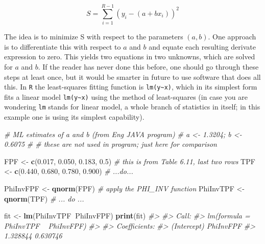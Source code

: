 \documentclass[
]{book}
\newenvironment{Shaded}{\begin{snugshade}}{\end{snugshade}}
\newcommand{\CommentTok}[1]{\textcolor[rgb]{0.56,0.35,0.01}{\textit{#1}}}
\newcommand{\FloatTok}[1]{\textcolor[rgb]{0.00,0.00,0.81}{#1}}
\newcommand{\KeywordTok}[1]{\textcolor[rgb]{0.13,0.29,0.53}{\textbf{#1}}}
\newcommand{\NormalTok}[1]{#1}
\newcommand{\OperatorTok}[1]{\textcolor[rgb]{0.81,0.36,0.00}{\textbf{#1}}}
\newcommand{\StringTok}[1]{\textcolor[rgb]{0.31,0.60,0.02}{#1}}
\begin{document}
\begin{equation*} 
S  = \sum_{i=1}^{R-1}\left ( y_i - \left ( a + bx_i \right ) \right )^2
\end{equation*}

The idea is to minimize S with respect to the parameters \((a,b)\). One approach is to differentiate this with respect to \(a\) and \(b\) and equate each resulting derivate expression to zero. This yields two equations in two unknowns, which are solved for \(a\) and \(b\). If the reader has never done this before, one should go through these steps at least once, but it would be smarter in future to use software that does all this. In \texttt{R} the least-squares fitting function is \texttt{lm(y\textasciitilde{}x)}, which in its simplest form fits a linear model \texttt{lm(y\textasciitilde{}x)} using the method of least-squares (in case you are wondering \texttt{lm} stands for linear model, a whole branch of statistics in itself; in this example one is using its simplest capability).

\begin{Shaded}
\begin{Highlighting}[]
\CommentTok{# ML estimates of a and b (from Eng JAVA program)}
\CommentTok{# a <- 1.3204; b <- 0.6075 }
\CommentTok{# # these are not used in program; just here for comparison}

\NormalTok{FPF <-}\StringTok{ }\KeywordTok{c}\NormalTok{(}\FloatTok{0.017}\NormalTok{, }\FloatTok{0.050}\NormalTok{, }\FloatTok{0.183}\NormalTok{, }\FloatTok{0.5}\NormalTok{)  }
\CommentTok{# this is from Table 6.11, last two rows}
\NormalTok{TPF <-}\StringTok{ }\KeywordTok{c}\NormalTok{(}\FloatTok{0.440}\NormalTok{, }\FloatTok{0.680}\NormalTok{, }\FloatTok{0.780}\NormalTok{, }\FloatTok{0.900}\NormalTok{)}
\CommentTok{# ...do...}

\NormalTok{PhiInvFPF <-}\StringTok{ }\KeywordTok{qnorm}\NormalTok{(FPF)}
\CommentTok{# apply the PHI_INV function}
\NormalTok{PhiInvTPF <-}\StringTok{ }\KeywordTok{qnorm}\NormalTok{(TPF)}
\CommentTok{# ... do ... }

\NormalTok{fit <-}\StringTok{ }\KeywordTok{lm}\NormalTok{(PhiInvTPF}\OperatorTok{~}\NormalTok{PhiInvFPF)}
\KeywordTok{print}\NormalTok{(fit)}
\CommentTok{#> }
\CommentTok{#> Call:}
\CommentTok{#> lm(formula = PhiInvTPF ~ PhiInvFPF)}
\CommentTok{#> }
\CommentTok{#> Coefficients:}
\CommentTok{#> (Intercept)    PhiInvFPF  }
\CommentTok{#>    1.328844     0.630746}
\end{Highlighting}
\end{Shaded}
\end{document}
